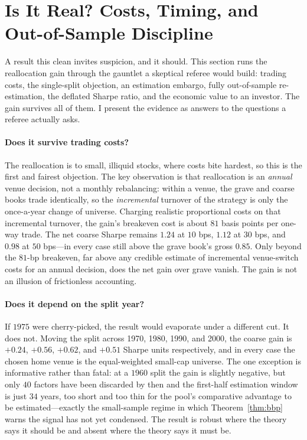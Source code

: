 \documentclass[12pt]{article}
\theoremstyle{plain}
\theoremstyle{definition}
\begin{document}
\section{Is It Real? Costs, Timing, and Out-of-Sample Discipline}
\label{sec:robust}

A result this clean invites suspicion, and it should. This section runs the
reallocation gain through the gauntlet a skeptical referee would build: trading
costs, the single-split objection, an estimation embargo, fully out-of-sample
re-estimation, the deflated Sharpe ratio, and the economic value to an investor.
The gain survives all of them. I present the evidence as answers to the questions
a referee actually asks.

\paragraph{Does it survive trading costs?} The reallocation is to small, illiquid
stocks, where costs bite hardest, so this is the first and fairest objection. The
key observation is that reallocation is an \emph{annual} venue decision, not a
monthly rebalancing: within a venue, the grave and coarse books trade identically,
so the \emph{incremental} turnover of the strategy is only the once-a-year change
of universe. Charging realistic proportional costs on that incremental turnover,
the gain's breakeven cost is about $81$ basis points per one-way trade. The net
coarse Sharpe remains $1.24$ at $10$ bps, $1.12$ at $30$ bps, and $0.98$ at $50$
bps---in every case still above the grave book's gross $0.85$. Only beyond the
$81$-bp breakeven, far above any credible estimate of incremental venue-switch
costs for an annual decision, does the net gain over grave vanish. The gain is
not an illusion of frictionless accounting.

\paragraph{Does it depend on the split year?} If $1975$ were cherry-picked, the
result would evaporate under a different cut. It does not. Moving the split
across 1970, 1980, 1990, and 2000, the coarse gain is $+0.24$, $+0.56$, $+0.62$,
and $+0.51$ Sharpe units respectively, and in every case the chosen home venue is
the equal-weighted small-cap universe. The one exception is informative rather
than fatal: at a $1960$ split the gain is slightly negative, but only $40$
factors have been discarded by then and the first-half estimation window is just
$34$ years, too short and too thin for the pool's comparative advantage to be
estimated---exactly the small-sample regime in which Theorem~\ref{thm:bbp} warns
the signal has not yet condensed. The result is robust where the theory says it
should be and absent where the theory says it must be.
\end{document}
